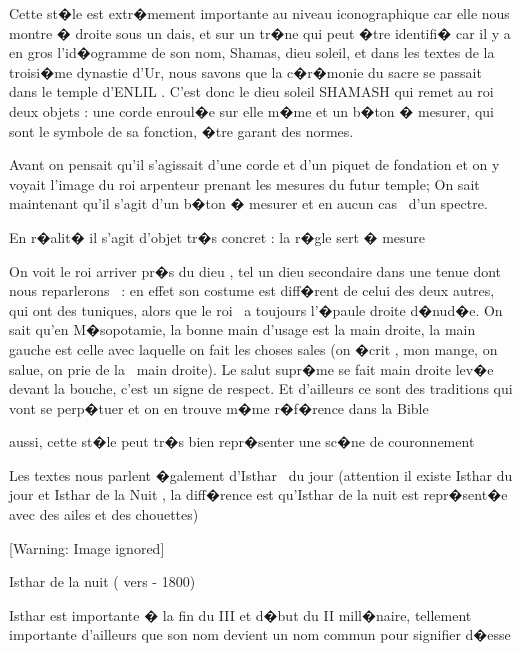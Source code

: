\documentclass{article}
\begin{document}
\bigskip


\bigskip

Cette st�le est extr�mement importante au niveau iconographique car elle nous montre � droite sous un dais, et sur un tr�ne qui peut �tre identifi� car il y a en gros l'id�ogramme de son nom, Shamas, dieu soleil, et dans les textes de la troisi�me dynastie d'Ur, nous savons que la c�r�monie du sacre se passait dans le temple d'ENLIL . C'est donc le dieu soleil SHAMASH qui remet au roi deux objets : une corde enroul�e sur elle m�me et un b�ton � mesurer, qui sont le symbole de sa fonction, �tre garant des normes.

Avant on pensait qu'il s'agissait d'une corde et d'un piquet de fondation et on y voyait l'image du roi arpenteur prenant les mesures du futur temple; On sait maintenant qu'il s'agit d'un b�ton � mesurer et en aucun cas \ d'un spectre.

En r�alit� il s'agit d'objet tr�s concret : la r�gle sert � mesure

On voit le roi arriver pr�s du dieu , tel un dieu secondaire dans une tenue dont nous reparlerons \ : en effet son costume est diff�rent de celui des deux autres, qui ont des tuniques, alors que le roi \ a toujours l'�paule droite d�nud�e. On sait qu'en M�sopotamie, la bonne main d'usage est la main droite, la main gauche est celle avec laquelle on fait les choses sales (on �crit , mon mange, on salue, on prie de la \ main droite). Le salut supr�me se fait main droite lev�e devant la bouche, c'est un signe de respect. Et d'ailleurs ce sont des traditions qui vont se perp�tuer et on en trouve m�me r�f�rence dans la Bible

aussi, cette st�le peut tr�s bien repr�senter une sc�ne de couronnement


\bigskip

Les textes nous parlent �galement d'Isthar \ du jour (attention il existe Isthar du jour et Isthar de la Nuit , la diff�rence est qu'Isthar de la nuit est repr�sent�e avec des ailes et des chouettes)


\bigskip

  [Warning: Image ignored] %
 


\bigskip

Isthar de la nuit ( vers - 1800)\ \ 


\bigskip

Isthar est importante � la fin du III et d�but du II mill�naire, tellement importante d'ailleurs que son nom devient un nom commun pour signifier d�esse
\end{document}
